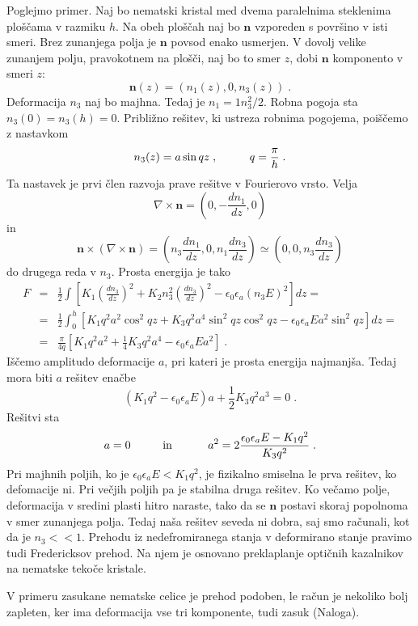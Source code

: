 Poglejmo primer. Naj bo nematski kristal med dvema paralelnima steklenima
ploščama v razmiku $h$. Na obeh ploščah naj bo $\mathbf{n}$ vzporeden
s površino v isti smeri. Brez zunanjega polja je $\mathbf{n}$ povsod
enako usmerjen. V dovolj velike zunanjem polju, pravokotnem na plošči,
naj bo to smer $z$, dobi $\mathbf{n}$ komponento v smeri $z$: 
\begin{equation}
\mathbf{n}(z)=(n_{1}(z),0,n_{3}(z))\;.\label{7.73}
\end{equation}
 Deformacija $n_{3}$ naj bo majhna. Tedaj je $n_{1}=1n_{3}^{2}/2$.
Robna pogoja sta $n_{3}(0)=n_{3}(h)=0$. Približno rešitev, ki ustreza
robnima pogojema, poiščemo z nastavkom 
\begin{equation}
n_{3}(z)=a\sin qz\;,\mbox{\hskip1cm}q=\frac{\pi}{h}\;.\label{7.74}
\end{equation}
 Ta nastavek je prvi člen razvoja prave rešitve v Fourierovo vrsto.
Velja 
\begin{equation}
\nabla\times\mathbf{n}=(0,-\frac{dn_{1}}{dz},0)\label{7.75}
\end{equation}
 in 
\begin{equation}
\mathbf{n}\times(\nabla\times\mathbf{n})=(n_{3}\frac{dn_{1}}{dz},0,n_{1}\frac{dn_{3}}{dz})\simeq(0,0,n_{3}\frac{dn_{3}}{dz})\label{7.76}
\end{equation}
 do drugega reda v $n_{3}$. Prosta energija je tako 
\begin{eqnarray}
F & = & \frac{1}{2}\int\left[K_{1}\left(\frac{dn_{3}}{dz}\right)^{2}+K_{2}n_{3}^{2}\left(\frac{dn_{3}}{dz}\right)^{2}-\epsilon_{0}\epsilon_{a}(n_{3}E)^{2}\right]dz=\nonumber \\
 & = & \frac{1}{2}\int_{0}^{h}[K_{1}q^{2}a^{2}\cos^{2}qz+K_{3}q^{2}a^{4}\sin^{2}qz\cos^{2}qz-\epsilon_{0}\epsilon_{a}Ea^{2}\sin^{2}qz]dz=\nonumber \\
 & = & \frac{\pi}{4q}[K_{1}q^{2}a^{2}+\frac{1}{4}K_{3}q^{2}a^{4}-\epsilon_{0}\epsilon_{a}Ea^{2}]\;.
\end{eqnarray}
 Iščemo amplitudo deformacije $a$, pri kateri je prosta energija
najmanjša. Tedaj mora biti $a$ rešitev enačbe 
\begin{equation}
(K_{1}q^{2}-\epsilon_{0}\epsilon_{a}E)a+\frac{1}{2}K_{3}q^{2}a^{3}=0\;.\label{7.78}
\end{equation}
 Rešitvi sta 
\begin{equation}
a=0\mbox{\hskip1cm in \hskip1cm}a^{2}=2\frac{\epsilon_{0}\epsilon_{a}E-K_{1}q^{2}}{K_{3}q^{2}}\;.\label{7.79}
\end{equation}
 Pri majhnih poljih, ko je $\epsilon_{0}\epsilon_{a}E<K_{1}q^{2}$,
je fizikalno smiselna le prva rešitev, ko defomacije ni. Pri večjih
poljih pa je stabilna druga rešitev. Ko večamo polje, deformacija
v sredini plasti hitro naraste, tako da se $\mathbf{n}$ postavi skoraj
popolnoma v smer zunanjega polja. Tedaj naša rešitev seveda ni dobra,
saj smo računali, kot da je $n_{3}<<1$. Prehodu iz nedefromiranega
stanja v deformirano stanje pravimo tudi Fredericksov prehod. Na njem
je osnovano preklaplanje optičnih kazalnikov na nematske tekoče kristale.

V primeru zasukane nematske celice je prehod podoben, le račun je
nekoliko bolj zapleten, ker ima deformacija vse tri komponente, tudi
zasuk (Naloga).